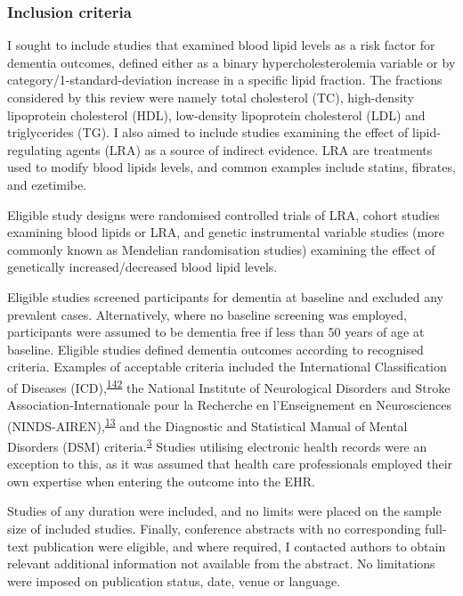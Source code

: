 \documentclass[a4paper, twoside]{templates/ociamthesis}
\begin{document}
\hypertarget{inclusion-criteria}{%
\subsubsection{Inclusion criteria}\label{inclusion-criteria}}

I sought to include studies that examined blood lipid levels as a risk factor for dementia outcomes, defined either as a binary hypercholesterolemia variable or by category/1-standard-deviation increase in a specific lipid fraction. The fractions considered by this review were namely total cholesterol (TC), high-density lipoprotein cholesterol (HDL), low-density lipoprotein cholesterol (LDL) and triglycerides (TG). I also aimed to include studies examining the effect of lipid-regulating agents (LRA) as a source of indirect evidence. LRA are treatments used to modify blood lipids levels, and common examples include statins, fibrates, and ezetimibe.

Eligible study designs were randomised controlled trials of LRA, cohort studies examining blood lipids or LRA, and genetic instrumental variable studies (more commonly known as Mendelian randomisation studies) examining the effect of genetically increased/decreased blood lipid levels.

Eligible studies screened participants for dementia at baseline and excluded any prevalent cases. Alternatively, where no baseline screening was employed, participants were assumed to be dementia free if less than 50 years of age at baseline. Eligible studies defined dementia outcomes according to recognised criteria. Examples of acceptable criteria included the International Classification of Diseases (ICD),\textsuperscript{\protect\hyperlink{ref-organizationwho1993}{142}} the National Institute of Neurological Disorders and Stroke Association-Internationale pour la Recherche en l'Enseignement en Neurosciences (NINDS-AIREN),\textsuperscript{\protect\hyperlink{ref-roman1993}{13}} and the Diagnostic and Statistical Manual of Mental Disorders (DSM) criteria.\textsuperscript{\protect\hyperlink{ref-edition2013}{3}} Studies utilising electronic health records were an exception to this, as it was assumed that health care professionals employed their own expertise when entering the outcome into the EHR.

Studies of any duration were included, and no limits were placed on the sample size of included studies. Finally, conference abstracts with no corresponding full-text publication were eligible, and where required, I contacted authors to obtain relevant additional information not available from the abstract. No limitations were imposed on publication status, date, venue or language.
\end{document}
